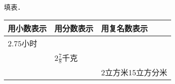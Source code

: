 
填表．\\
\begin{center}
	\begin{tabular}{|l|l|l|}
	\hline
	用小数表示 & 用分数表示 &  用复名数表示  \\ \hline
	$2.75$小时 &  &    \\ \hline
	 & $2\frac{7}{8}$千克 &    \\ \hline
	 &  & 2立方米15立方分米   \\ \hline
    \end{tabular}
\end{center}
